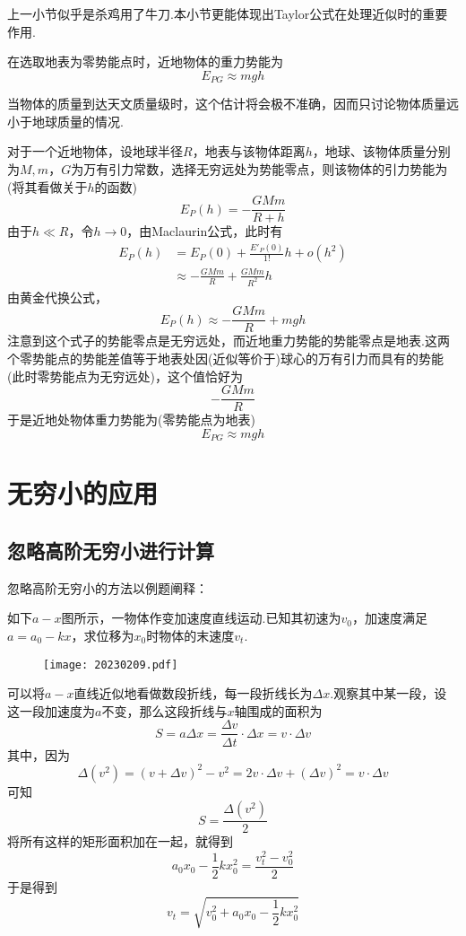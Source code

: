 上一小节似乎是杀鸡用了牛刀.本小节更能体现出Taylor公式在处理近似时的重要作用.

\begin{proposition}
	在选取地表为零势能点时，近地物体的重力势能为$$E_{PG} \approx mgh$$
\end{proposition}
\begin{remark}
	当物体的质量到达天文质量级时，这个估计将会极不准确，因而只讨论物体质量远小于地球质量的情况.
\end{remark}

对于一个近地物体，设地球半径$R$，地表与该物体距离$h$，地球、该物体质量分别为$M,m$，$G$为万有引力常数，选择无穷远处为势能零点，则该物体的引力势能为(将其看做关于$h$的函数)$$E_P(h) = - \frac{GMm}{R+h}$$
由于$h \ll R$，令$h \to 0$，由Maclaurin公式，此时有
\begin{align*}
	E_P(h) &= E_P(0)+\frac{E'_P(0)}{1!}h + o(h^2) \\
	&\approx -\frac{GMm}{R} + \frac{GMm}{R^2} h
\end{align*}
由黄金代换公式，$$E_P(h) \approx -\frac{GMm}{R} + mgh$$
注意到这个式子的势能零点是无穷远处，而近地重力势能的势能零点是地表.这两个零势能点的势能差值等于地表处因(近似等价于)球心的万有引力而具有的势能(此时零势能点为无穷远处)，这个值恰好为$$-\frac{GMm}{R}$$
于是近地处物体重力势能为(零势能点为地表)$$E_{PG} \approx mgh$$

\chapter{无穷小的应用}

\section{忽略高阶无穷小进行计算}

忽略高阶无穷小的方法以例题阐释：

\begin{example}
	如下$a-x$图所示，一物体作变加速度直线运动.已知其初速为$v_0$，加速度满足$a=a_0-kx$，求位移为$x_0$时物体的末速度$v_t$.
	\begin{figure}[htbp]
		\begin{center}
			\texttt{[image: 20230209.pdf]}
		\end{center}
	\caption{}
	\end{figure}
\end{example}
\begin{solution}
	可以将$a-x$直线近似地看做数段折线，每一段折线长为$\Delta x$.观察其中某一段，设这一段加速度为$a$不变，那么这段折线与$x$轴围成的面积为$$S = a\Delta x = \frac{\Delta v}{\Delta t} \cdot \Delta x = v \cdot \Delta v$$
	其中，因为$$\Delta (v^2) = (v+\Delta v)^2 - v^2 = 2v \cdot \Delta v + (\Delta v)^2 = v \cdot \Delta v$$
	可知$$S = \frac{\Delta (v^2)}{2}$$
	将所有这样的矩形面积加在一起，就得到$$a_0x_0 - \frac{1}{2}kx_0^2 = \frac{v_t^2-v_0^2}{2}$$
	于是得到$$v_t = \sqrt{v_0^2 + a_0x_0 - \frac{1}{2}kx_0^2}$$
\end{solution}

